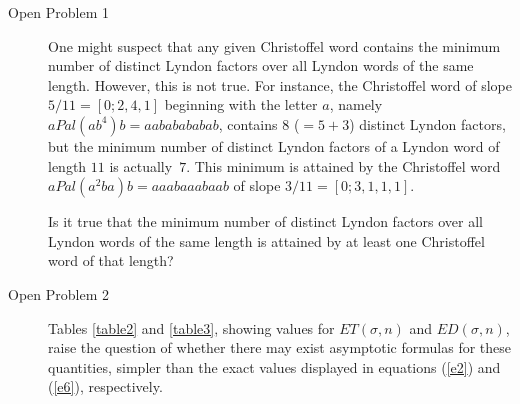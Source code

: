\documentclass[11pt]{amsart}
\newcommand{\1}{\bar{1}}
\theoremstyle{plain}
\theoremstyle{definition}
\theoremstyle{remark}
\begin{document}
\begin{description}
\item[Open Problem 1] One might suspect that any given Christoffel word contains the minimum number of distinct Lyndon factors over all Lyndon words of the same length. However, this is not true. For instance, the Christoffel word of slope $5/11=[0;2,4,1]$ beginning with the letter $a$, namely $aPal(ab^4)b = aababababab$, contains $8$ ($= 5 + 3$) distinct Lyndon factors, but the minimum number of distinct Lyndon factors of a Lyndon word of length $11$ is actually~$7$. This minimum is attained by the Christoffel word $aPal(a^2ba)b = aaabaaabaab$ of slope $3/11=[0;3,1,1,1]$.

Is it true that the minimum number of distinct Lyndon factors over all Lyndon words of the same length is attained by at least one Christoffel word of that length?

\item[Open Problem 2] Tables \ref{table2} and \ref{table3}, showing values for $ET(\sigma,n)$ and $ED(\sigma,n)$, raise the question of whether there may exist asymptotic formulas for these quantities, simpler than the exact values displayed in equations (\ref{e2}) and (\ref{e6}), respectively.
\end{description}




 
\end{document}
